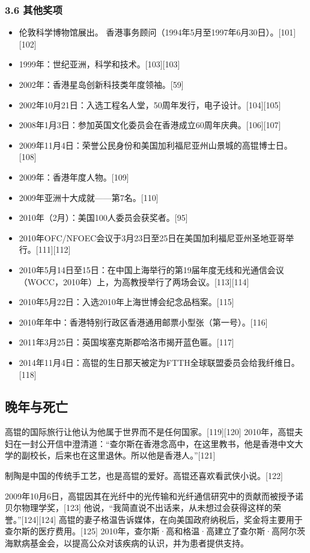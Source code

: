 \subsubsection{3.6 其他奖项}
\begin{itemize}
\item 伦敦科学博物馆展出。
香港事务顾问（1994年5月至1997年6月30日）。[101][102]
\item 1999年：世纪亚洲，科学和技术。[103][103]
\item 2002年：香港星岛创新科技类年度领袖。[59]
\item 2002年10月21日：入选工程名人堂，50周年发行，电子设计。[104][105]
\item 2008年1月3日：参加英国文化委员会在香港成立60周年庆典。[106][107]
\item 2009年11月4日：荣誉公民身份和美国加利福尼亚州山景城的高锟博士日。[108]
\item 2009年：香港年度人物。[109]
\item 2009年亚洲十大成就——第7名。[110]
\item 2010年（2月）：美国100人委员会获奖者。[95]
\item 2010年OFC/NFOEC会议于3月23日至25日在美国加利福尼亚州圣地亚哥举行。[111][112]
\item 2010年5月14日至15日：在中国上海举行的第19届年度无线和光通信会议（WOCC，2010年）上，为高教授举行了两场会议。[113][114]
\item 2010年5月22日：入选2010年上海世博会纪念品档案。[115]
\item 2010年年中：香港特别行政区香港通用邮票小型张（第一号）。[116]
\item 2011年3月25日：英国埃塞克斯郡哈洛市揭开蓝色匾。[117]
\item 2014年11月4日：高锟的生日那天被定为FTTH全球联盟委员会给我纤维日。[118]
\end{itemize}

\subsection{晚年与死亡}
高锟的国际旅行让他认为他属于世界而不是任何国家。[119][120] 2010年，高锟夫妇在一封公开信中澄清道：“查尔斯在香港念高中，在这里教书，他是香港中文大学的副校长，后来也在这里退休。所以他是香港人。”[121]

制陶是中国的传统手工艺，也是高锟的爱好。高锟还喜欢看武侠小说。[122]

2009年10月6日，高锟因其在光纤中的光传输和光纤通信研究中的贡献而被授予诺贝尔物理学奖，[123] 他说，“我简直说不出话来，从未想过会获得这样的荣誉。”[124][124] 高锟的妻子格温告诉媒体，在向美国政府纳税后，奖金将主要用于查尔斯的医疗费用。[125] 2010年，查尔斯·高和格温·高建立了查尔斯·高阿尔茨海默病基金会，以提高公众对该疾病的认识，并为患者提供支持。

